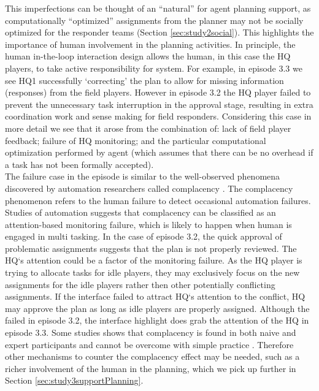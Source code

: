 This imperfections can be thought of an ``natural'' for agent planning support, as computationally ``optimized'' assignments from the planner may not be socially optimized for the responder teams (Section \ref{sec:study2social}). This highlights the importance of human involvement in the planning activities. In principle, the human in-the-loop interaction design allows the human, in this case the HQ players, to take active responsibility for system. For example, in episode 3.3 we see HQ1 successfully `correcting' the plan to allow for missing information (responses) from the field players. However in episode 3.2 the HQ player failed to prevent the unnecessary task interruption in the approval stage, resulting in extra coordination work and sense making for field responders. Considering this case in more detail we see that it arose from the combination of: lack of field player feedback; failure of HQ monitoring; and the particular computational optimization performed by agent (which assumes that there can be no overhead if a task has not been formally accepted).\\

The failure case in the episode is similar to the well-observed phenomena discovered by automation researchers called complacency \cite{Kaber1997}. The complacency phenomenon refers to the human failure to detect occasional automation failures. Studies of automation suggests that complacency can be classified as an attention-based monitoring failure, which is likely to happen when human is engaged in multi tasking. In the case of episode 3.2, the quick approval of problematic assignments suggests that the plan is not properly reviewed. The HQ`s attention could be a factor of the monitoring failure. As the HQ player is trying to allocate tasks for idle players, they may exclusively focus on the new assignments for the idle players rather then other potentially conflicting assignments.  If the interface failed to attract HQ`s attention to the conflict, HQ may approve the plan as long as idle players are properly assigned. Although the failed in episode 3.2, the interface highlight does grab the attention of the HQ in episode 3.3. Some studies shows that complacency is found in both naive and expert participants and cannot be overcome with simple practice \cite{Parasuraman2010}. Therefore other mechanisms to counter the complacency effect may be needed, such as a richer involvement of the human in the planning, which we pick up further in Section \ref{sec:study3supportPlanning}.\\

